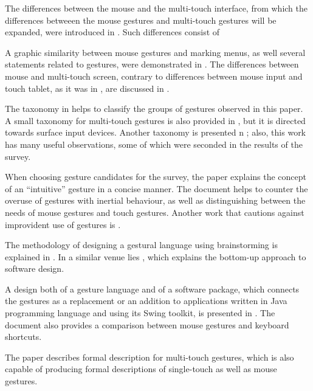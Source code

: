\documentclass{aes130}
\begin{document}
The differences between the mouse and the multi-touch interface, from which the differences betweeen
the mouse gestures and multi-touch gestures will be expanded, were introduced in \cite{Buxton:1985:ITT:325334.325239}.
Such differences consist of 

A graphic similarity between mouse gestures and marking menus, as well several statements related
to gestures, were demonstrated in \cite{Kurtenbach:1993:LEP:164632.164977}.
The differences between mouse and multi-touch screen, contrary to differences between mouse input
and touch tablet, as it was in \cite{Kurtenbach:1993:LEP:164632.164977}, are discussed in
\cite{Forlines:2007:DVM:1240624.1240726}.

The taxonomy in \cite{ecs11149} helps to classify the groups of gestures observed in this paper.
A small taxonomy for multi-touch gestures is also provided in \cite{Wigdor:2010:ANU:1842993.1842997},
but it is directed towards surface input devices. Another taxonomy is presented 
n \cite{Wobbrock:2009:UGS:1518701.1518866}; also, this work has many useful observations,
some of which were seconded in the results of the survey.

When choosing gesture candidates for the survey, the paper \cite{Naumann:2007:IUU:1784197.1784212}
explains the concept of an ``intuitive'' gesture in a concise manner. The document \cite{Lee:2009:EEP:1520340.1520667}
helps to counter the overuse of gestures with inertial behaviour, as well as distinguishing between
the needs of mouse gestures and touch gestures. Another work that cautions against improvident use
of gestures is \cite{Norman:2010:GIS:1836216.1836228}.

The methodology of designing a gestural language using brainstorming is explained in
\cite{Akers:2007:ODM:1240866.1240868}. In a similar venue lies \cite{SalatBottomUpApproach}, which explains
the bottom-up approach to software design.

A design both of a gesture language and of a software package, which connects the gestures
as a replacement or an addition to applications written in Java programming language and using
its Swing toolkit, is presented in \cite{Appert:2009:USC:1518701.1519052}. The document also
provides a comparison between mouse gestures and keyboard shortcuts.

The paper \cite{Kammer:2010:TFM:1936652.1936662} describes formal description for multi-touch gestures,
which is also capable of producing formal descriptions of single-touch as well as mouse gestures.
\end{document}
